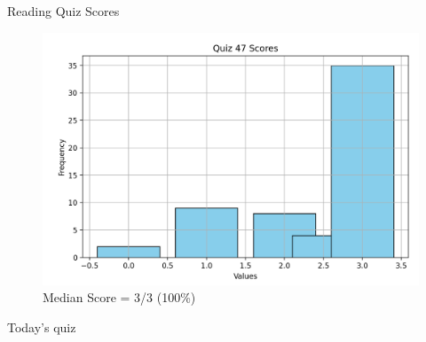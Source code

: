 \documentclass[10pt]{beamer}
\begin{document}
\begin{frame}{Reading Quiz Scores}
\begin{figure}[ht]
        \centering
        \includegraphics[width=.9\textwidth]{images/reading_quiz_scores}
   		 \caption{Median Score = 3/3 (100\%)}
\end{figure}


\end{frame}	




\begin{frame}[standout]
Today's quiz
\end{frame}
\end{document}
